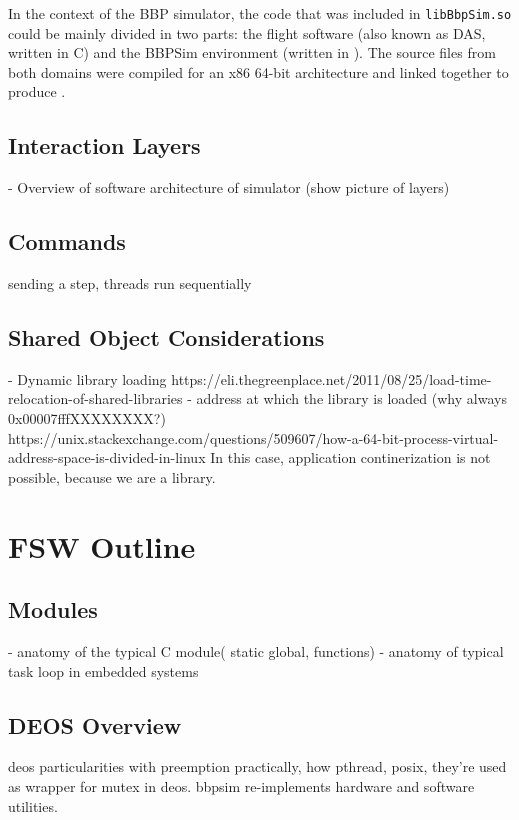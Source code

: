 {In the context of the \gls{BBP} simulator, the code that was included in \texttt{libBbpSim.so} could be mainly divided in two parts: the flight software (also known as \gls{DAS}, written in C) and the \gls{BBPSim} environment (written in \Cpp). The source files from both domains were compiled for an x86 64-bit architecture and linked together to produce .

\subsection*{Interaction Layers}
- Overview of software architecture of simulator (show picture of layers)
\subsection*{Commands}
sending a step, threads run sequentially
\subsection*{Shared Object Considerations}\label{sec:dynlib-considerations}
- Dynamic library loading  https://eli.thegreenplace.net/2011/08/25/load-time-relocation-of-shared-libraries
- address at which the library is loaded (why always 0x00007fffXXXXXXXX?) https://unix.stackexchange.com/questions/509607/how-a-64-bit-process-virtual-address-space-is-divided-in-linux
In this case, application continerization is not possible, because we are a library.

\section{FSW Outline}
\subsection{Modules}
- anatomy of the typical C module( static global, functions)
- anatomy of typical task loop in embedded systems 
\subsection{DEOS Overview}
deos particularities with preemption
practically, how pthread, posix, they're used as wrapper for mutex in deos.
bbpsim re-implements hardware and software utilities.
}
